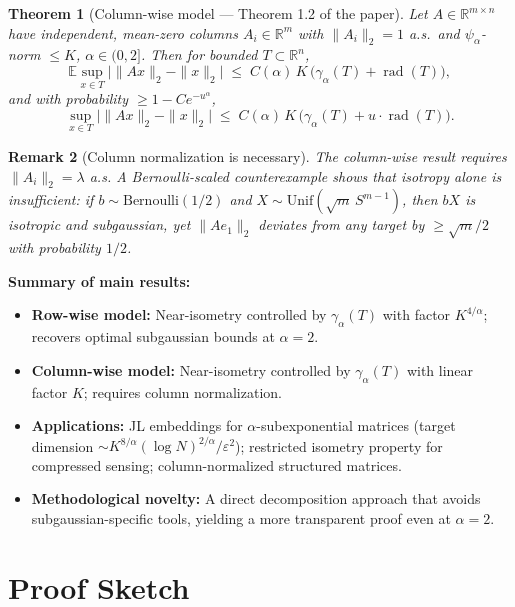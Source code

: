 \documentclass[11pt,a4paper]{article}
\newtheorem{theorem}{Theorem}
\newtheorem{remark}[theorem]{Remark}
\begin{document}
\begin{theorem}[Column-wise model --- Theorem 1.2 of the paper]\label{thm:col}
Let $A\in\mathbb{R}^{m\times n}$ have independent, mean-zero columns $A_i\in\mathbb{R}^m$ with $\|A_i\|_2=1$ a.s.\ and $\psi_\alpha$-norm $\le K$, $\alpha\in(0,2]$. Then for bounded $T\subset\mathbb{R}^n$,
\[
  \mathbb{E}\sup_{x\in T}\bigl|\|Ax\|_2-\|x\|_2\bigr|
  \;\le\; C(\alpha)\,K\,\bigl(\gamma_\alpha(T)+\operatorname{rad}(T)\bigr),
\]
and with probability $\ge 1-Ce^{-u^\alpha}$,
\[
  \sup_{x\in T}\bigl|\|Ax\|_2-\|x\|_2\bigr|
  \;\le\; C(\alpha)\,K\,\bigl(\gamma_\alpha(T)+u\cdot\operatorname{rad}(T)\bigr).
\]
\end{theorem}

\begin{remark}[Column normalization is necessary]
The column-wise result \emph{requires} $\|A_i\|_2=\lambda$ a.s. A Bernoulli-scaled counterexample shows that isotropy alone is insufficient: if $b\sim\mathrm{Bernoulli}(1/2)$ and $X\sim\mathrm{Unif}(\sqrt{m}\,S^{m-1})$, then $bX$ is isotropic and subgaussian, yet $\|A e_1\|_2$ deviates from any target by $\ge \sqrt{m}/2$ with probability $1/2$.
\end{remark}

\noindent\textbf{Summary of main results:}
\begin{itemize}[leftmargin=*]
  \item \textbf{Row-wise model:} Near-isometry controlled by $\gamma_\alpha(T)$ with factor $K^{4/\alpha}$; recovers optimal subgaussian bounds at $\alpha=2$.
  \item \textbf{Column-wise model:} Near-isometry controlled by $\gamma_\alpha(T)$ with linear factor $K$; requires column normalization.
  \item \textbf{Applications:} JL embeddings for $\alpha$-subexponential matrices (target dimension $\sim K^{8/\alpha}(\log N)^{2/\alpha}/\varepsilon^2$); restricted isometry property for compressed sensing; column-normalized structured matrices.
  \item \textbf{Methodological novelty:} A direct decomposition approach that avoids subgaussian-specific tools, yielding a more transparent proof even at $\alpha=2$.
\end{itemize}

\section{Proof Sketch}
\end{document}
